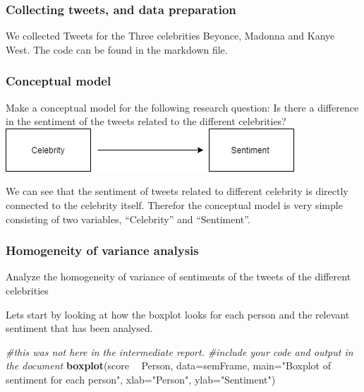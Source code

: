 \documentclass[]{article}
\newenvironment{Shaded}{\begin{snugshade}}{\end{snugshade}}
\newcommand{\KeywordTok}[1]{\textcolor[rgb]{0.13,0.29,0.53}{\textbf{#1}}}
\newcommand{\DataTypeTok}[1]{\textcolor[rgb]{0.13,0.29,0.53}{#1}}
\newcommand{\StringTok}[1]{\textcolor[rgb]{0.31,0.60,0.02}{#1}}
\newcommand{\CommentTok}[1]{\textcolor[rgb]{0.56,0.35,0.01}{\textit{#1}}}
\newcommand{\OperatorTok}[1]{\textcolor[rgb]{0.81,0.36,0.00}{\textbf{#1}}}
\newcommand{\NormalTok}[1]{#1}
\begin{document}
\subsubsection{Collecting tweets, and data
preparation}\label{collecting-tweets-and-data-preparation}

We collected Tweets for the Three celebrities Beyonce, Madonna and Kanye
West. The code can be found in the markdown file.

\subsubsection{Conceptual model}\label{conceptual-model}

Make a conceptual model for the following research question: Is there a
difference in the sentiment of the tweets related to the different
celebrities? \includegraphics{figures/TwitterConceptualModel.png}

We can see that the sentiment of tweets related to different celebrity
is directly connected to the celebrity itself. Therefor the conceptual
model is very simple consisting of two variables, ``Celebrity'' and
``Sentiment''.

\subsubsection{Homogeneity of variance
analysis}\label{homogeneity-of-variance-analysis}

Analyze the homogeneity of variance of sentiments of the tweets of the
different celebrities

Lets start by looking at how the boxplot looks for each person and the
relevant sentiment that has been analysed.

\begin{Shaded}
\begin{Highlighting}[]
\CommentTok{#this was not here in the intermediate report.}
\CommentTok{#include your code and output in the document}
\KeywordTok{boxplot}\NormalTok{(score }\OperatorTok{~}\StringTok{ }\NormalTok{Person, }\DataTypeTok{data=}\NormalTok{semFrame, }\DataTypeTok{main=}\StringTok{"Boxplot of sentiment for each person"}\NormalTok{,}
        \DataTypeTok{xlab=}\StringTok{"Person"}\NormalTok{, }\DataTypeTok{ylab=}\StringTok{"Sentiment"}\NormalTok{)}
\end{Highlighting}
\end{Shaded}
\end{document}
